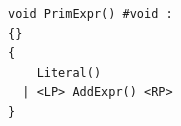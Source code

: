 \documentclass[dvipdfmx]{jarticle}
\begin{document}
\begin{minipage}{0.6\textwidth}
\begin{Verbatim}[frame=single]
void PrimExpr() #void :
{}
{
    Literal()
  | <LP> AddExpr() <RP>
}
\end{Verbatim}
\end{minipage}
\end{document}
